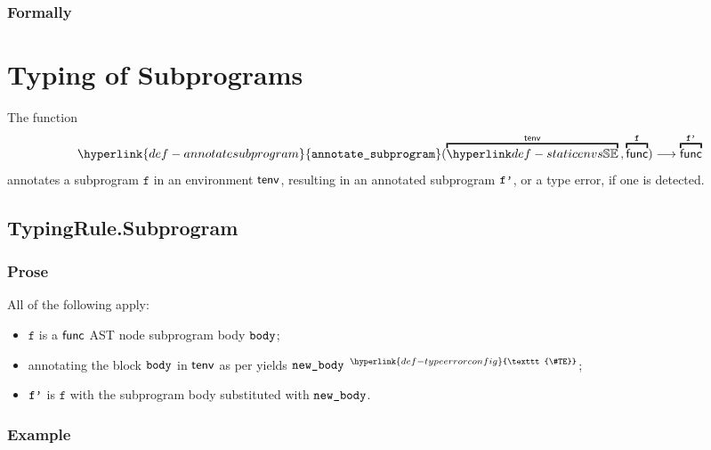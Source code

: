 \documentclass{book}
\newcommand\TypeErrorConfig[0]{\hyperlink{def-typeerrorconfig}{\texttt{\#TE}}}
\newcommand\ProseOrTypeError[0]{\hyperlink{def-proseortypeerror}{$^{\TypeErrorConfig}$}}
\newcommand\annotaterel[0]{\hyperlink{def-annotaterel}{\textsf{type}}}
\newcommand\typearrow[0]{\xrightarrow{\annotaterel}}
\newcommand\findsubprogram[0]{\hyperlink{def-findsubprogram}{\texttt{find\_subprogram}}}
\newcommand\annotatesubprogram[1]{\hyperlink{def-annotatesubprogram}{\texttt{annotate\_subprogram}}(#1)}
\newcommand\vf[0]{\texttt{f}}
\newcommand\nameone[0]{\texttt{name1}}
\newcommand\name[0]{\texttt{name}}
\begin{document}
\begin{emptyformal}
\subsection{Formally}
\end{emptyformal}

\chapter{Typing of Subprograms}
\hypertarget{def-annotatesubprogram}{}
The function
\[
  \annotatesubprogram{\overname{\staticenvs}{\tenv} \aslsep \overname{\func}{\vf}} \aslto \overname{\func}{\vfp}
\]
annotates a subprogram $\vf$ in an environment $\textsf{tenv}$, resulting in an annotated subprogram $\texttt{f'}$,
or a type error, if one is detected.

\section{TypingRule.Subprogram \label{sec:TypingRule.Subprogram}}

\subsection{Prose}
All of the following apply:
\begin{itemize}
  \item $\vf$ is a $\textsf{func}$ AST node subprogram body $\texttt{body}$;
  \item annotating the block $\texttt{body}$ in $\textsf{tenv}$ as per  yields $\texttt{new\_body}$ \ProseOrTypeError;
  \item $\texttt{f'}$ is $\vf$ with the subprogram body substituted with $\texttt{new\_body}$.
\end{itemize}

\subsection{Example}

\end{document}
